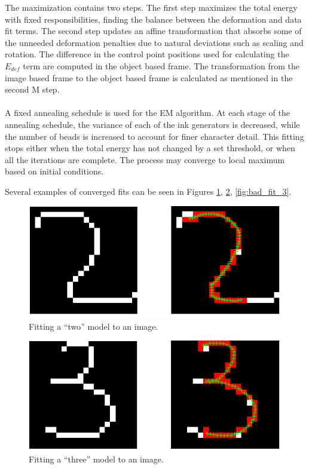 \documentclass[oribibl]{llncs}
\begin{document}
The maximization contains two steps. The first step maximizes the total energy with fixed responsibilities, finding the balance between the deformation and data fit terms. The second step updates an affine transformation that absorbs some of the unneeded deformation penalties due to natural deviations such as scaling and rotation. The difference in the control point positions used for calculating the $E_{def}$ term are computed in the object based frame. The transformation from the image based frame to the object based frame is calculated as mentioned in the second M step.
\\
\\
A fixed annealing schedule is used for the EM algorithm. At each stage of the annealing schedule, the variance of each of the ink generators is decreased, while the number of beads is increased to account for finer character detail. This fitting stops either when the total energy has not changed by a set threshold, or when all the iterations are complete. The process may converge to local maximum based on initial conditions.

Several examples of converged fits can be seen in Figures \ref{fig:good_fit_2}, \ref{fig:good_fit_3}, \ref{fig:bad_fit_3}.

\begin{figure}
\centering
\includegraphics[width=.7\linewidth]{figs/good_fit_2.png}
\caption{Fitting a ``two'' model to an image.}
\label{fig:good_fit_2}
\end{figure}

\begin{figure}
\centering
\includegraphics[width=.7\linewidth]{figs/good_fit_3.png}
\caption{Fitting a ``three'' model to an image.}
\label{fig:good_fit_3}
\end{figure}
\end{document}

